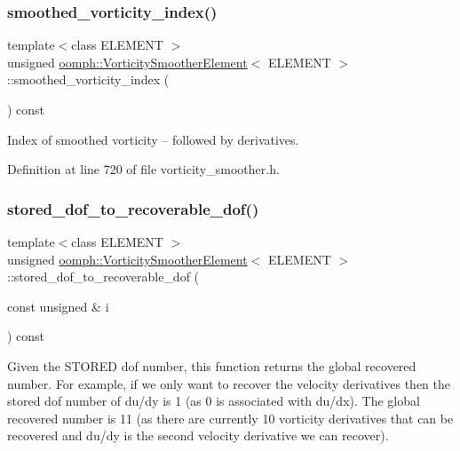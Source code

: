 \subsubsection{\texorpdfstring{smoothed\+\_\+vorticity\+\_\+index()}{smoothed\_vorticity\_index()}}
{\footnotesize\ttfamily template$<$class E\+L\+E\+M\+E\+NT $>$ \\
unsigned \hyperlink{classoomph_1_1VorticitySmootherElement}{oomph\+::\+Vorticity\+Smoother\+Element}$<$ E\+L\+E\+M\+E\+NT $>$\+::smoothed\+\_\+vorticity\+\_\+index (\begin{DoxyParamCaption}{ }\end{DoxyParamCaption}) const\hspace{0.3cm}{\ttfamily [inline]}}



Index of smoothed vorticity -- followed by derivatives. 



Definition at line 720 of file vorticity\+\_\+smoother.\+h.

\mbox{\label{classoomph_1_1VorticitySmootherElement_aa0c9c94ce5dafa63f243511be306a237}} 
\subsubsection{\texorpdfstring{stored\+\_\+dof\+\_\+to\+\_\+recoverable\+\_\+dof()}{stored\_dof\_to\_recoverable\_dof()}}
{\footnotesize\ttfamily template$<$class E\+L\+E\+M\+E\+NT $>$ \\
unsigned \hyperlink{classoomph_1_1VorticitySmootherElement}{oomph\+::\+Vorticity\+Smoother\+Element}$<$ E\+L\+E\+M\+E\+NT $>$\+::stored\+\_\+dof\+\_\+to\+\_\+recoverable\+\_\+dof (\begin{DoxyParamCaption}\item[{const unsigned \&}]{i }\end{DoxyParamCaption}) const\hspace{0.3cm}{\ttfamily [inline]}}



Given the S\+T\+O\+R\+ED dof number, this function returns the global recovered number. For example, if we only want to recover the velocity derivatives then the stored dof number of du/dy is 1 (as 0 is associated with du/dx). The global recovered number is 11 (as there are currently 10 vorticity derivatives that can be recovered and du/dy is the second velocity derivative we can recover). 



